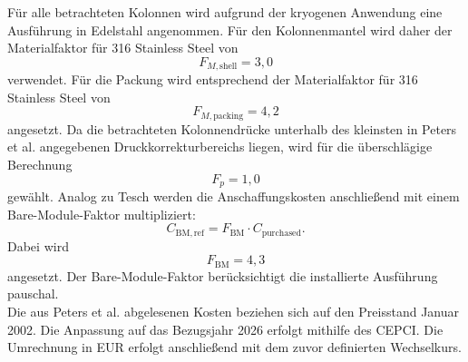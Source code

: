 Für alle betrachteten Kolonnen wird aufgrund der kryogenen Anwendung eine
Ausführung in Edelstahl angenommen. Für den Kolonnenmantel wird daher der Materialfaktor für 316 Stainless Steel von
\begin{equation}
    F_{M,\mathrm{shell}} = 3{,}0
\end{equation}
verwendet. Für die Packung wird entsprechend der Materialfaktor für
316 Stainless Steel von
\begin{equation}
    F_{M,\mathrm{packing}} = 4{,}2
\end{equation}
angesetzt. Da die betrachteten Kolonnendrücke unterhalb des kleinsten in Peters et al. angegebenen Druckkorrekturbereichs liegen, wird für die überschlägige Berechnung
\begin{equation}
    F_p = 1{,}0
\end{equation}
gewählt. Analog zu Tesch werden die Anschaffungskosten anschließend mit einem Bare-Module-Faktor multipliziert:
\begin{equation}
    C_{\mathrm{BM,ref}}
    =
    F_{\mathrm{BM}}
    \cdot
    C_{\mathrm{purchased}} .
\end{equation}
Dabei wird
\begin{equation}
    F_{\mathrm{BM}} = 4{,}3
\end{equation}
angesetzt. Der Bare-Module-Faktor berücksichtigt die installierte Ausführung pauschal.\\
Die aus Peters et al. abgelesenen Kosten beziehen sich auf den Preisstand
Januar 2002. Die Anpassung auf das Bezugsjahr 2026 erfolgt mithilfe des CEPCI. Die Umrechnung in EUR erfolgt anschließend mit dem zuvor definierten Wechselkurs. 

